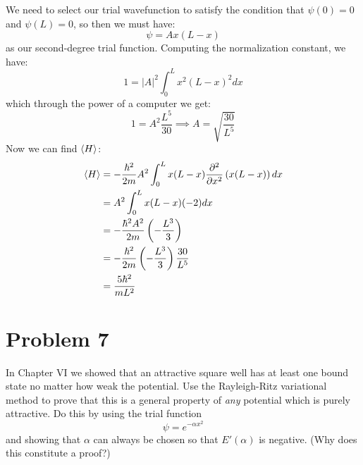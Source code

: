 \documentclass[10pt]{article}
\begin{document}
	\begin{solution}
		We need to select our trial wavefunction to satisfy the condition that $\psi(0) = 0$ and $\psi(L) = 0$, so then we must have: 
		\[ \psi = Ax(L-x)\] 
		as our second-degree trial function. Computing the normalization constant, we have: 
		\[ 1 = |A|^2 \int_0^L x^2(L - x)^2 dx\] 
		which through the power of a computer we get:
		\[ 1 = A^2 \frac{L^5}{30} \implies A = \sqrt{\frac{30}{L^5}}\]
		Now we can find $\langle H \rangle$:
		\begin{align*}
			\langle H \rangle &= -\frac{\hbar^2}{2m} A^2 \int_0^L x(L - x) \pdv[2]{x} \left( x(L - x)\right) dx\\
			&= A^2 \int_0^L x(L - x) (-2) dx\\
			&= -\frac{\hbar^2 A^2}{2m} \left( -\frac{L^3}{3}\right)\\
			&= -\frac{\hbar^2}{2m} \left( -\frac{L^3}{3}\right) \frac{30}{L^5}\\
			&= \frac{5\hbar^2}{mL^2}
		\end{align*}
	\end{solution}

	\pagebreak

	\section*{Problem 7}
	In Chapter VI we showed that an attractive square well has at least one bound state no matter how weak the potential. Use the Rayleigh-Ritz variational method to prove that this is a general property of \textit{any} potential which is purely attractive. Do this by using the trial function 
	\[ \psi = e^{-\alpha x^2}\]
	and showing that $\alpha$ can always be chosen so that $E'(\alpha)$ is negative. (Why does this constitute a proof?)
\end{document}
